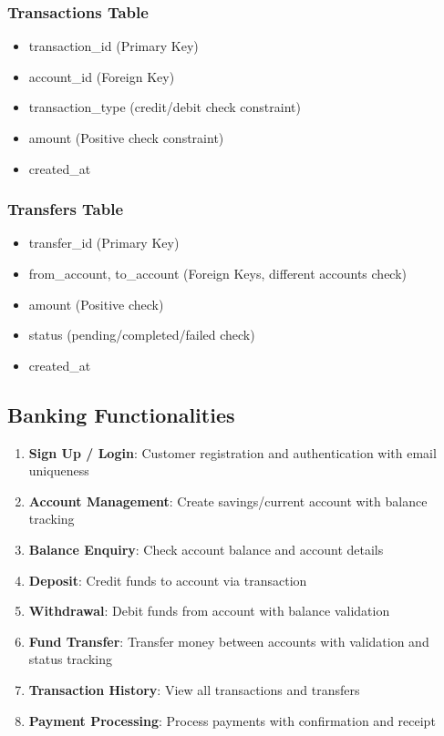 \documentclass[12pt]{article}
\begin{document}
\subsubsection{Transactions Table}
\begin{itemize}
    \item transaction\_id (Primary Key)
    \item account\_id (Foreign Key)
    \item transaction\_type (credit/debit check constraint)
    \item amount (Positive check constraint)
    \item created\_at
\end{itemize}

\subsubsection{Transfers Table}
\begin{itemize}
    \item transfer\_id (Primary Key)
    \item from\_account, to\_account (Foreign Keys, different accounts check)
    \item amount (Positive check)
    \item status (pending/completed/failed check)
    \item created\_at
\end{itemize}

\subsection{Banking Functionalities}

\begin{enumerate}
    \item \textbf{Sign Up / Login}: Customer registration and authentication with email uniqueness
    
    \item \textbf{Account Management}: Create savings/current account with balance tracking
    
    \item \textbf{Balance Enquiry}: Check account balance and account details
    
    \item \textbf{Deposit}: Credit funds to account via transaction
    
    \item \textbf{Withdrawal}: Debit funds from account with balance validation
    
    \item \textbf{Fund Transfer}: Transfer money between accounts with validation and status tracking
    
    \item \textbf{Transaction History}: View all transactions and transfers
    
    \item \textbf{Payment Processing}: Process payments with confirmation and receipt
\end{enumerate}
\end{document}
